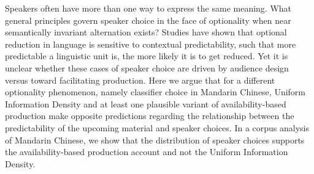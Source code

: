Speakers often have more than one way to express the same meaning. What general principles govern speaker choice in the face of optionality when near semantically invariant alternation exists? Studies have shown that optional reduction in language is sensitive to contextual predictability, such that more predictable a linguistic unit is, the more likely it is to get reduced. Yet it is unclear whether these cases of speaker choice are driven by audience design versus toward facilitating production. Here we argue that for a different optionality phenomenon, namely classifier choice in Mandarin Chinese, Uniform Information Density and at least one plausible variant of availability-based production make opposite predictions regarding the relationship between the predictability of the upcoming material and speaker choices. In a corpus analysis of Mandarin Chinese, we show that the distribution of speaker choices supports the availability-based production account and not the Uniform Information Density.
